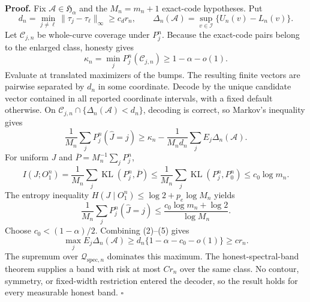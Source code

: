 \textbf{Proof.}
Fix \(\mathcal A\in\mathfrak H_\alpha\) and the \(M_n=m_n+1\) exact-code hypotheses. Put
\[
 d_n=\min_{j\ne\ell}\|\tau_j-\tau_\ell\|_\infty\ge c_dr_n,
 \qquad \Delta_n(\mathcal A)=\sup_{v\in\mathcal I}\{U_n(v)-L_n(v)\}. \tag{1}
\]
Let \(\mathcal C_{j,n}\) be whole-curve coverage under \(P_j^n\). Because the exact-code pairs belong to the enlarged class, honesty gives
\[
 \kappa_n=\min_jP_j^n(\mathcal C_{j,n})\ge1-\alpha-o(1). \tag{2}
\]
Evaluate at translated maximizers of the bumps. The resulting finite vectors are pairwise separated by \(d_n\) in some coordinate. Decode by the unique candidate vector contained in all reported coordinate intervals, with a fixed default otherwise. On \(\mathcal C_{j,n}\cap\{\Delta_n(\mathcal A)<d_n\}\), decoding is correct, so Markov's inequality gives
\[
 \frac1{M_n}\sum_jP_j^n(\widehat J=j)
 \ge\kappa_n-\frac1{M_nd_n}\sum_jE_j\Delta_n(\mathcal A). \tag{3}
\]
For uniform \(J\) and \(\overline P=M_n^{-1}\sum_jP_j^n\),
\[
 I(J;O_1^n)=\frac1{M_n}\sum_j\operatorname{KL}(P_j^n,\overline P)
 \le\frac1{M_n}\sum_j\operatorname{KL}(P_j^n,P_0^n)
 \le c_0\log m_n. \tag{4}
\]
The entropy inequality \(H(J\mid O_1^n)\le\log2+p_e\log M_n\) yields
\[
 \frac1{M_n}\sum_jP_j^n(\widehat J=j)
 \le\frac{c_0\log m_n+\log2}{\log M_n}. \tag{5}
\]
Choose \(c_0<(1-\alpha)/2\). Combining (2)--(5) gives
\[
 \max_jE_j\Delta_n(\mathcal A)
 \ge d_n\{1-\alpha-c_0-o(1)\}\ge cr_n. \tag{6}
\]
The supremum over \(\mathcal Q_{\mathrm{spec},n}\) dominates this maximum. The honest-spectral-band theorem supplies a band with risk at most \(Cr_n\) over the same class. No contour, symmetry, or fixed-width restriction entered the decoder, so the result holds for every measurable honest band. \(\square\)